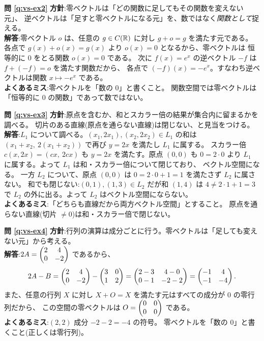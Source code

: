 \bigskip
\noindent\textbf{問 \ref{q:vs-ex2}}\quad
\textbf{方針}:零ベクトルは「どの関数に足してもその関数を変えない元」、
逆ベクトルは「足すと零ベクトルになる元」を、数ではなく\emph{関数として}捉える。\\
\textbf{解答}:零ベクトル $o$ は、任意の $g \in C(\mathbb{R})$ に対し $g + o = g$ を満たす元である。
各点で $g(x) + o(x) = g(x)$ より $o(x) = 0$ となるから、零ベクトルは
恒等的に $0$ をとる関数 $o(x) = 0$ である。
次に $f(x) = e^x$ の逆ベクトル $-f$ は $f + (-f) = o$ を満たす関数だから、
各点で $(-f)(x) = -e^x$。すなわち逆ベクトルは関数 $x \mapsto -e^x$ である。\\
\textbf{よくあるミス}:零ベクトルを「数の $0$」と書くこと。
関数空間では零ベクトルは「恒等的に $0$ の関数」であって数ではない。

\bigskip
\noindent\textbf{問 \ref{q:vs-ex3}}\quad
\textbf{方針}:原点を含むか、和とスカラー倍の結果が集合内に留まるかを調べる。
切片のある直線(原点を通らない直線)は閉じない、と見当をつける。\\
\textbf{解答}:$L_1$ について調べる。$(x_1, 2x_1), (x_2, 2x_2) \in L_1$ の和は
$(x_1 + x_2,\ 2(x_1 + x_2))$ で再び $y = 2x$ を満たし $L_1$ に属する。
スカラー倍 $c(x, 2x) = (cx,\ 2cx)$ も $y = 2x$ を満たす。原点 $(0,0)$ も
$0 = 2 \cdot 0$ より $L_1$ に属する。よって $L_1$ は和・スカラー倍について閉じており、
ベクトル空間になる。
一方 $L_2$ について、原点 $(0,0)$ は $0 = 2 \cdot 0 + 1 = 1$ を満たさず $L_2$ に属さない。
和でも閉じない:$(0,1), (1,3) \in L_2$ だが和 $(1,4)$ は $4 \ne 2 \cdot 1 + 1 = 3$ で
$L_2$ の外に出る。よって $L_2$ はベクトル空間にならない。\\
\textbf{よくあるミス}:「どちらも直線だから両方ベクトル空間」とすること。
原点を通らない直線(切片 $\ne 0$)は和・スカラー倍で閉じない。

\bigskip
\noindent\textbf{問 \ref{q:vs-ex4}}\quad
\textbf{方針}:行列の演算は成分ごとに行う。零ベクトルは「足しても変えない元」から考える。\\
\textbf{解答}:$2A = \begin{pmatrix}2 & 4 \\ 0 & -2\end{pmatrix}$ であるから、
\[
2A - B = \begin{pmatrix}2 & 4 \\ 0 & -2\end{pmatrix} - \begin{pmatrix}3 & 0 \\ 1 & 2\end{pmatrix}
= \begin{pmatrix}2 - 3 & 4 - 0 \\ 0 - 1 & -2 - 2\end{pmatrix} = \begin{pmatrix}-1 & 4 \\ -1 & -4\end{pmatrix}.
\]
また、任意の行列 $X$ に対し $X + O = X$ を満たす元はすべての成分が $0$ の零行列だから、
この空間の零ベクトルは $O = \begin{pmatrix}0 & 0 \\ 0 & 0\end{pmatrix}$ である。\\
\textbf{よくあるミス}:$(2,2)$ 成分 $-2 - 2 = -4$ の符号。
零ベクトルを「数の $0$」と書くこと(正しくは零行列)。

